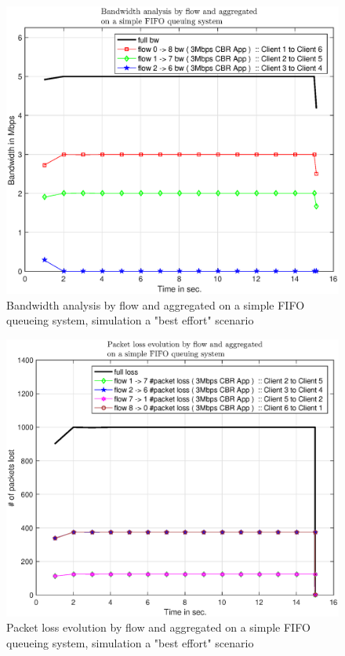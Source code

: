 \documentclass[conference,compsoc]{IEEEtran}
\begin{document}
     \begin{figure}[H]
     \centering
     \includegraphics[width=1\columnwidth]{EPS/A/bw_a2.eps}
     \caption{Bandwidth analysis by flow and aggregated on a simple FIFO queueing system, simulation a "best effort" scenario}
     \label{graph:bw_a2}
     \end{figure}


     \begin{figure}[H]
     \centering
     \includegraphics[width=1\columnwidth]{EPS/A/loss_a2.eps}
     \caption{Packet loss evolution by flow and aggregated on a simple FIFO queueing system, simulation a "best effort" scenario}\label{graph:loss_a2}
     \end{figure}
\end{document}
